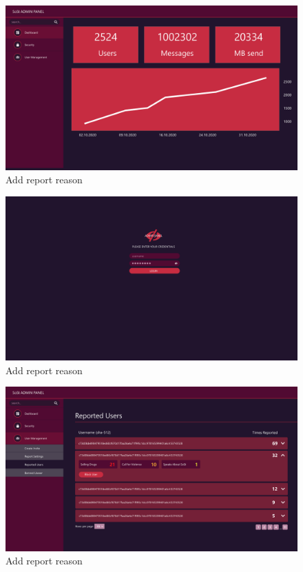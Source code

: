 \begin{figure}[h]
    \centering
    \includegraphics[width=1.0\textwidth]{./graphics/wireframes/AdminDashboard}
    \caption{Add report reason}
    \label{fig:figure9}
\end{figure}

\begin{figure}[h]
    \centering
    \includegraphics[width=1.0\textwidth]{./graphics/wireframes/AdminLogin}
    \caption{Add report reason}
    \label{fig:figure10}
\end{figure}

\begin{figure}[h]
    \centering
    \includegraphics[width=1.0\textwidth]{./graphics/wireframes/AdminReportedUsers}
    \caption{Add report reason}
    \label{fig:figure11}
\end{figure}

